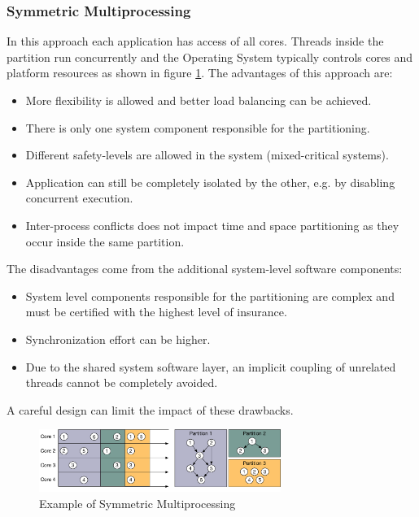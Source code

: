 \subsubsection{Symmetric Multiprocessing}
In this approach each application has access of all cores. Threads inside the partition run concurrently and the Operating System typically controls cores and platform resources as shown in figure \ref{fig:SMP}. The advantages of this approach are:
\begin{itemize}
\item More flexibility is allowed and better load balancing can be achieved.
\item There is only one system component responsible for the partitioning.
\item Different safety-levels are allowed in the system (mixed-critical systems).
\item Application can still be completely isolated by the other, e.g. by disabling concurrent execution.
\item Inter-process conflicts does not impact time and space partitioning as they occur inside the same partition.
\end{itemize}
\par The disadvantages come from the additional system-level software components:
\begin{itemize}
\item System level components responsible for the partitioning are complex and must be certified with the highest level of insurance.
\item Synchronization effort can be higher.
\item Due to the shared system software layer, an implicit coupling of unrelated threads cannot be completely avoided.
\end{itemize}
A careful design can limit the impact of these drawbacks. 

\begin{figure}[htbp]
  \centering
  \includegraphics[width=0.7\textwidth]{SMP}
  \caption{Example of Symmetric Multiprocessing}
  \label{fig:SMP}
\end{figure}

